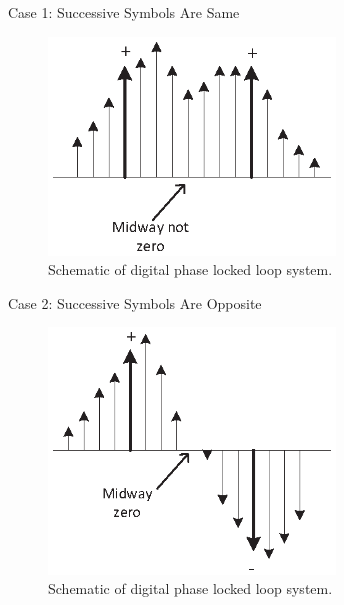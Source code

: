 \documentclass[10pt]{beamer}
\begin{document}

\begin{frame}[fragile]{Case 1: Successive Symbols Are Same}


  \begin{figure}[h]
     \centering
     \includegraphics[width=3in,keepaspectratio=true]{./lab01p02b.eps}
     \caption{Schematic of digital phase locked loop system.}
  \end{figure}

\end{frame}



\begin{frame}[fragile]{Case 2: Successive Symbols Are Opposite}


  \begin{figure}[h]
     \centering
     \includegraphics[width=3in,keepaspectratio=true]{./lab01p02c.eps}
     \caption{Schematic of digital phase locked loop system.}
  \end{figure}

\end{frame}


\end{document}
